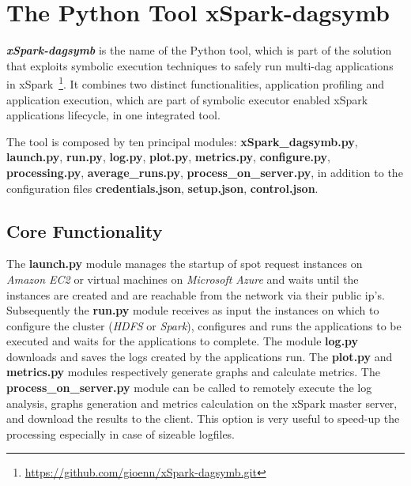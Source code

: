 
\section{The Python Tool xSpark-dagsymb}\label{sec:xspark_dagsymb}

\textbf\textit{xSpark-dagsymb} is the name of the Python tool, which is part of the \tool solution that exploits symbolic execution techniques to safely run multi-dag applications in xSpark~\footnote{\url{https://github.com/gioenn/xSpark-dagsymb.git}}.
It combines two distinct functionalities, application profiling and
application execution, which are part of symbolic executor enabled
xSpark applications lifecycle, in one integrated tool.

The tool is composed by ten principal modules:
\textbf{xSpark\_dagsymb.py}, \textbf{launch.py}, \textbf{run.py},
\textbf{log.py}, \textbf{plot.py}, \textbf{metrics.py},
\textbf{configure.py}, \textbf{processing.py},
\textbf{average\_runs.py}, \textbf{process\_on\_server.py}, in addition
to the configuration files \textbf{credentials.json},
\textbf{setup.json}, \textbf{control.json}.

\hypertarget{core-functionality}{%
\subsection{Core Functionality}\label{core-functionality}}

The \textbf{launch.py} module manages the startup of spot request
instances on \emph{Amazon EC2} or virtual machines on \emph{Microsoft
Azure} and waits until the instances are created and are reachable from
the network via their public ip's. Subsequently the \textbf{run.py}
module receives as input the instances on which to configure the cluster
(\emph{HDFS} or \emph{Spark}), configures and runs the applications to
be executed and waits for the applications to complete. The module
\textbf{log.py} downloads and saves the logs created by the applications
run. The \textbf{plot.py} and \textbf{metrics.py} modules respectively
generate graphs and calculate metrics. The
\textbf{process\_on\_server.py} module can be called to remotely execute
the log analysis, graphs generation and metrics calculation on the
xSpark master server, and download the results to the client. This
option is very useful to speed-up the processing especially in case of
sizeable logfiles.

